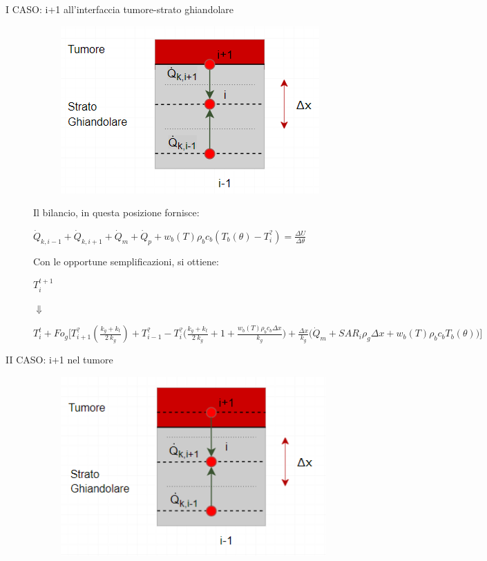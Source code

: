 \begin{description}
    \item[I CASO: i+1 all'interfaccia tumore-strato ghiandolare]
    \begin{figure}[H]
    \centering
    \includegraphics[width=.6\textwidth]{Immagini/Nodi/nodo16.1.png} 
    \label{nodo16.1}
\end{figure}
\noindent
\newpage
Il bilancio, in questa posizione fornisce:
\begin{center}
	$ \Dot{Q} _{k, i-1} +\Dot{Q} _{k, i+1}+ \Dot{Q} _{m} +\Dot{Q} _{p}+ w_b (T) \rho _b c_b (T_b(\theta)-T_i ^?)= \frac{\Delta U}{\Delta \theta} $
\end{center}
Con le opportune semplificazioni, si ottiene:
\begin{center}
	$T_i ^{t+1} $
\end{center}
\begin{center}
	$\Downarrow$
\end{center}
\begin{center}
	$T_i ^t + Fo_{g} \Bigg[ T_{i+1} ^? (\frac{k_g+ k_{t}}{2 \: k_g}) + T_{i-1} ^?- T_i ^? \Big(\frac{k_g+ k_{t}}{2 \: k_g} + 1 + \frac{ w_b (T) \rho _b c_b \Delta x }{k_{g}} \Big) + \frac{\Delta x }{k_{g}} \Big(\Dot{Q} _{m} +  SAR_i \rho _{g} \Delta x + w_b (T) \rho _b c_b T_b(\theta)\Big) \Bigg]$
\end{center}


\item[II CASO: i+1 nel tumore]

     \begin{figure}[H]
    \centering
    \includegraphics[width=.6\textwidth]{Immagini/Nodi/nodo16.2.png} 
    \label{nodo2}
\end{figure}
\end{description}
